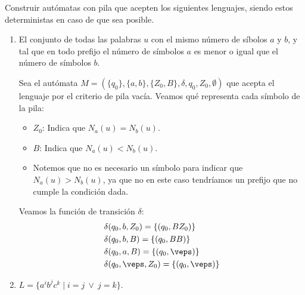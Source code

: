 \begin{ejercicio}\label{ej:1.5.12}
    Construir autómatas con pila que acepten los siguientes lenguajes, siendo estos deterministas en caso de que sea posible.
    \begin{enumerate}
        \item El conjunto de todas las palabras $u$ con el mismo número de síbolos $a$ y $b$, y tal que en todo prefijo el número de símbolos $a$ es menor o igual que el número de símbolos $b$.
        
        Sea el autómata $M = (\{q_0\},\{a,b\},\{Z_0,B\},\delta,q_0,Z_0,\emptyset)$ que acepta el lenguaje por el criterio de pila vacía. Veamos qué representa cada símbolo de la pila:
        \begin{itemize}
            \item $Z_0$: Indica que $N_a(u)=N_b(u)$.
            \item $B$: Indica que $N_a(u)<N_b(u)$.
            \item Notemos que no es necesario un símbolo para indicar que $N_a(u)>N_b(u)$, ya que no en este caso tendríamos un prefijo que no cumple la condición dada.
        \end{itemize}
        Veamos la función de transición $\delta$:
        \begin{align*}
            &\delta(q_0,b,Z_0) = \{(q_0,BZ_0)\} \\
            &\delta(q_0,b,B) = \{(q_0,BB)\} \\
            &\delta(q_0,a,B) = \{(q_0,\veps)\} \\
            &\delta(q_0,\veps,Z_0) = \{(q_0,\veps)\}
        \end{align*}

        \item $L = \{a^i b^j c^k \mid i=j\ \lor\ j = k\}$.
        
    \end{enumerate}
\end{ejercicio}

